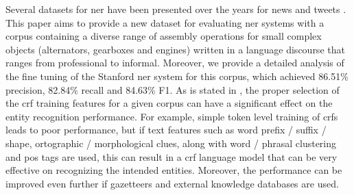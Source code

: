 Several datasets for \gls{ner} have been presented over the years for news and tweets \cite{Dojchinovski2013,Roder2014}. This paper aims to provide a new dataset for evaluating \gls{ner} systems with a corpus containing a diverse range of assembly operations for small complex objects (alternators, gearboxes and engines) written in a language discourse that ranges from professional to informal. Moreover, we provide a detailed analysis of the fine tuning of the Stanford \gls{ner} system for this corpus, which achieved 86.51\% precision, 82.84\% recall and 84.63\% F1. As is stated in \cite{Tkachenko2012}, the proper selection of the \gls{crf} training features for a given corpus can have a significant effect on the entity recognition performance. For example, simple token level training of \glspl{crf} leads to poor performance, but if text features such as word prefix / suffix / shape, ortographic / morphological clues, along with word / phrasal clustering and \gls{pos} tags are used, this can result in a \gls{crf} language model that can be very effective on recognizing the intended entities. Moreover, the performance can be improved even further if gazetteers and external knowledge databases are used.

